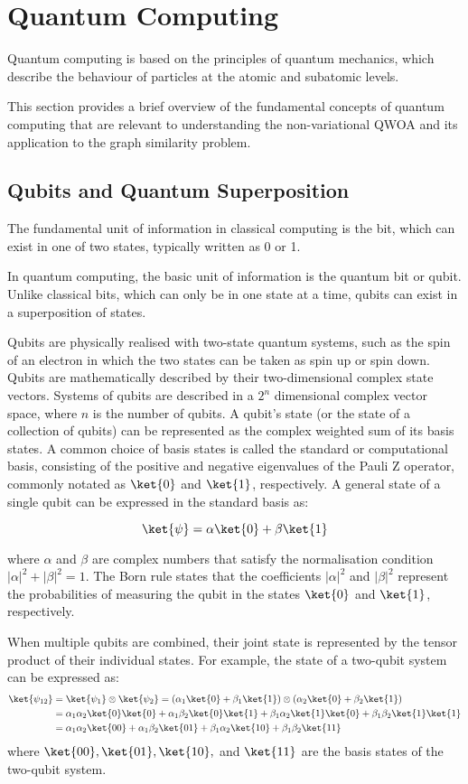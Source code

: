 \section{Quantum Computing}
Quantum computing is based on the principles of quantum mechanics, which describe the behaviour of particles at the atomic and subatomic levels.

This section provides a brief overview of the fundamental concepts of quantum computing that are relevant to understanding the non-variational QWOA and its application to the graph similarity problem. 

\subsection{Qubits and Quantum Superposition}

The fundamental unit of information in classical computing is the bit, which can exist in one of two states, typically written as 0 or 1.

In quantum computing, the basic unit of information is the quantum bit or qubit. Unlike classical bits, which can only be in one state at a time, qubits can exist in a superposition of states.

Qubits are physically realised with two-state quantum systems, such as the spin of an electron in which the two states can be taken as spin up or spin down. Qubits are mathematically described by their two-dimensional complex state vectors. Systems of qubits are described in a $2^n$ dimensional complex vector space, where $n$ is the number of qubits. A qubit's state (or the state of a collection of qubits) can be represented as the complex weighted sum of its basis states. A common choice of basis states is called the standard or computational basis, consisting of the positive and negative eigenvalues of the Pauli Z operator, commonly notated as $\ket{0}$ and $\ket{1}$, respectively. A general state of a single qubit can be expressed in the standard basis as:

$$\ket{\psi} = \alpha\ket{0} + \beta\ket{1}$$

where $\alpha$ and $\beta$ are complex numbers that satisfy the normalisation condition $|\alpha|^2 + |\beta|^2 = 1$. The Born rule states that the coefficients $|\alpha|^2$  and $|\beta|^2$ represent the probabilities of measuring the qubit in the states $\ket{0}$ and $\ket{1}$, respectively.

When multiple qubits are combined, their joint state is represented by the tensor product of their individual states. For example, the state of a two-qubit system can be expressed as:
\begin{align*}
\ket{\psi_{12}} &= \ket{\psi_1} \otimes \ket{\psi_2} = (\alpha_1\ket{0} + \beta_1\ket{1}) \otimes (\alpha_2\ket{0} + \beta_2\ket{1})\\
&=\alpha_1\alpha_2\ket{0}\ket{0} + \alpha_1\beta_2\ket{0}\ket{1} + \beta_1\alpha_2\ket{1}\ket{0} + \beta_1\beta_2\ket{1}\ket{1}\\
&= \alpha_1\alpha_2\ket{00} + \alpha_1\beta_2\ket{01} + \beta_1\alpha_2\ket{10} + \beta_1\beta_2\ket{11}
\end{align*}
where $\ket{00}, \ket{01}, \ket{10},$ and $\ket{11}$ are the basis states of the two-qubit system.


